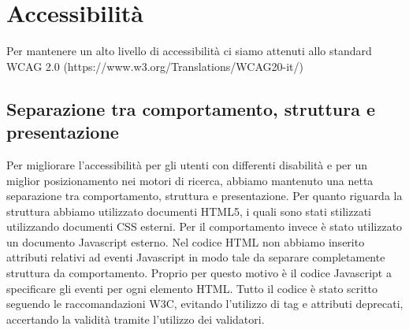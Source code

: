 \documentclass[a4paper]{article}
\begin{document}
    \section{Accessibilità}
    Per mantenere un alto livello di accessibilità ci siamo attenuti allo standard WCAG 2.0 (https://www.w3.org/Translations/WCAG20-it/)

    \subsection{Separazione tra comportamento, struttura e presentazione}
    Per migliorare l’accessibilità per gli utenti con differenti disabilità e per un miglior posizionamento nei motori di ricerca, abbiamo mantenuto una netta separazione tra comportamento, struttura e presentazione. Per quanto riguarda la struttura abbiamo utilizzato documenti HTML5, i quali sono stati stilizzati utilizzando documenti CSS esterni. Per il comportamento invece è stato utilizzato un documento Javascript esterno. Nel codice HTML non abbiamo inserito attributi relativi ad eventi Javascript in modo tale da separare completamente struttura da comportamento. Proprio per questo motivo è il codice Javascript a specificare gli eventi per ogni elemento HTML. Tutto il codice è stato scritto seguendo le raccomandazioni W3C, evitando l’utilizzo di tag e attributi deprecati, accertando la validità tramite l’utilizzo dei validatori.
\end{document}
